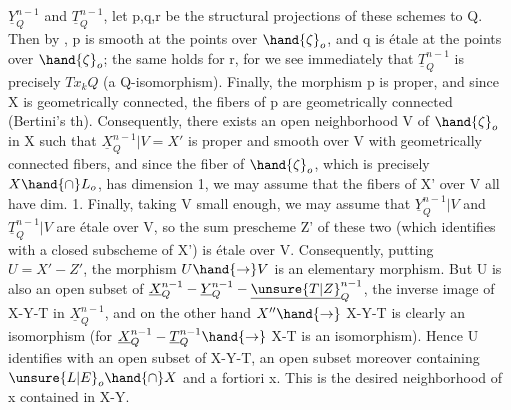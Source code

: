 
$\underline{Y}^{n-1}_Q$ and $\underline{T}^{n-1}_Q$,  let p,q,r be the structural projections
of these schemes to Q. Then by , p is smooth at the
points over $\hand{\zeta}_o$, and q is étale at the points over $\hand{\zeta}_o$;
the same holds for r, for we see immediately that $\underline{T}^{n-1}_Q$ is precisely
$Tx_kQ$ (a Q-isomorphism). Finally, the morphism p is proper, and since
X is geometrically connected, the fibers of p are geometrically
connected (Bertini's th). Consequently, there exists an open neighborhood
V of $\hand{\zeta}_o$ in X such that  $\underline{X}^{n-1}_Q|V = X'$ is proper and smooth
over V with geometrically connected fibers, and since the fiber of $\hand{\zeta}_o$,
which is precisely $X\hand{\cap} L_o$, has dimension 1, we may assume that the
fibers of X' over V all have dim. 1. Finally, taking V small enough,
we may assume that $\underline{Y}^{n-1}_Q|V$ and $\underline{T}^{n-1}_Q|V$ are étale over V, so the
sum prescheme Z' of these two (which identifies with a closed subscheme
of X') is étale over V. Consequently,  putting $U = X' - Z'$,
 the morphism $U\hand{\to} V$ is an elementary morphism. But  U is also
an open subset of $\underline{X}^{n-1}_Q - \underline{Y}^{n-1}_Q - \underline{\unsure{T|Z}}^{n-1}_Q$, the inverse image of X-Y-T in $\underline{X}^{n-1}_Q$,
and on the other hand $X''\hand{\to}$ X-Y-T is clearly an isomorphism (for
$\underline{X}^{n-1}_Q - \underline{T}^{n-1}_Q \hand{\to}$ X-T is an isomorphism). Hence U identifies with an open subset
of X-Y-T, an open subset moreover containing $\unsure{L|E}_o\hand{\cap} X$ and a fortiori x. This is the
desired neighborhood of x contained in X-Y.

